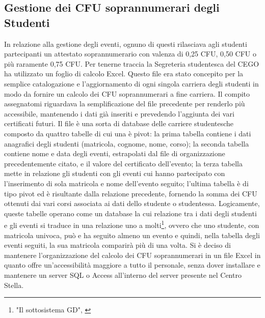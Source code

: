             \subsection{Gestione dei CFU soprannumerari degli Studenti}
                 \par
                    In relazione alla gestione degli eventi, ognuno di questi rilasciava agli studenti partecipanti un attestato soprannumerario con valenza di 0,25 CFU, 0,50 CFU o più raramente 0,75 CFU. Per tenerne traccia la Segreteria studentesca del CEGO ha utilizzato un foglio di calcolo Excel. Questo file era stato concepito per la semplice catalogazione e l'aggiornamento di ogni singola carriera degli studenti in modo da fornire un calcolo dei CFU soprannumerari a fine carriera. Il compito assegnatomi riguardava la semplificazione del file precedente per renderlo più accessibile, mantenendo i dati già inseriti e prevedendo l'aggiunta dei vari certificati futuri. \newline
                    Il file è una sorta di database delle carriere studentesche composto da quattro tabelle di cui una è pivot: la prima tabella contiene i dati anagrafici degli studenti (matricola, cognome, nome, corso); la seconda tabella contiene nome e data degli eventi, estrapolati dal file di organizzazione precedentemente citato, e il valore del certificato dell'evento; la terza tabella mette in relazione gli studenti con gli eventi cui hanno partecipato con l'inserimento di sola matricola e nome dell'evento seguito; l'ultima tabella è di tipo pivot ed è risultante dalla relazione precedente, fornendo la somma dei CFU ottenuti dai vari corsi associata ai dati dello studente o studentessa. \newline
                    Logicamente, queste tabelle operano come un database la cui relazione tra i dati degli studenti e gli eventi si traduce in una relazione uno a molti\footnote{"Il sottosistema GD", \cite{sciutoIntroduzioneAiSistemi2022}}, ovvero che uno studente, con matricola univoca, può e ha seguito almeno un evento e quindi, nella tabella degli eventi seguiti, la sua matricola comparirà più di una volta. \newline
                    Si è deciso di mantenere l'organizzazione del calcolo dei CFU soprannumerari in un file Excel in quanto offre un'accessibilità maggiore a tutto il personale, senza dover installare e mantenere un server SQL o Access all'interno del server presente nel Centro Stella.
